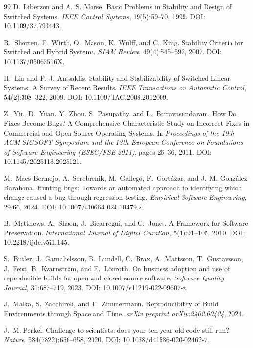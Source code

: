 \documentclass[11pt]{article}
\theoremstyle{definition}
\newcommand{\1}{\mathbf{1}}
\begin{document}
\begin{thebibliography}{99}
D.~Liberzon and A.~S. Morse.
\newblock Basic Problems in Stability and Design of Switched Systems.
\newblock \emph{IEEE Control Systems}, 19(5):59--70, 1999. DOI: 10.1109/37.793443.

R.~Shorten, F.~Wirth, O.~Mason, K.~Wulff, and C.~King.
\newblock Stability Criteria for Switched and Hybrid Systems.
\newblock \emph{SIAM Review}, 49(4):545--592, 2007. DOI: 10.1137/05063516X.

H.~Lin and P.~J. Antsaklis.
\newblock Stability and Stabilizability of Switched Linear Systems: A Survey of Recent Results.
\newblock \emph{IEEE Transactions on Automatic Control}, 54(2):308--322, 2009. DOI: 10.1109/TAC.2008.2012009.

Z.~Yin, D.~Yuan, Y.~Zhou, S.~Pasupathy, and L.~Bairavasundaram.
\newblock How Do Fixes Become Bugs? A Comprehensive Characteristic Study on Incorrect Fixes in Commercial and Open Source Operating Systems.
\newblock In \emph{Proceedings of the 19th ACM SIGSOFT Symposium and the 13th European Conference on Foundations of Software Engineering (ESEC/FSE 2011)}, pages 26--36, 2011. DOI: 10.1145/2025113.2025121.

M.~Maes-Bermejo, A.~Serebrenik, M.~Gallego, F.~Gort\'azar, and J.~M. Gonz\'alez-Barahona.
\newblock Hunting bugs: Towards an automated approach to identifying which change caused a bug through regression testing.
\newblock \emph{Empirical Software Engineering}, 29:66, 2024. DOI: 10.1007/s10664-024-10479-z.

B.~Matthews, A.~Shaon, J.~Bicarregui, and C.~Jones.
\newblock A Framework for Software Preservation.
\newblock \emph{International Journal of Digital Curation}, 5(1):91--105, 2010. DOI: 10.2218/ijdc.v5i1.145.

S.~Butler, J.~Gamalielsson, B.~Lundell, C.~Brax, A.~Mattsson, T.~Gustavsson, J.~Feist, B.~Kvarnstr\"om, and E.~L\"onroth.
\newblock On business adoption and use of reproducible builds for open and closed source software.
\newblock \emph{Software Quality Journal}, 31:687--719, 2023. DOI: 10.1007/s11219-022-09607-z.

J.~Malka, S.~Zacchiroli, and T.~Zimmermann.
\newblock Reproducibility of Build Environments through Space and Time.
\newblock \emph{arXiv preprint arXiv:2402.00424}, 2024.

J.~M. Perkel.
\newblock Challenge to scientists: does your ten-year-old code still run?
\newblock \emph{Nature}, 584(7822):656--658, 2020. DOI: 10.1038/d41586-020-02462-7.


\end{thebibliography}
\end{document}
